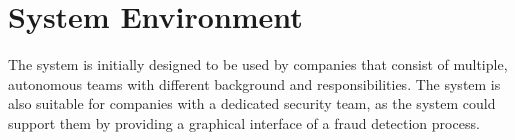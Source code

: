 \section{System Environment}

  The system is initially designed to be used by companies that consist of multiple, autonomous teams with different background and responsibilities. The system is also suitable for companies with a dedicated security team, as the system could support them by providing a graphical interface of a fraud detection process. 
